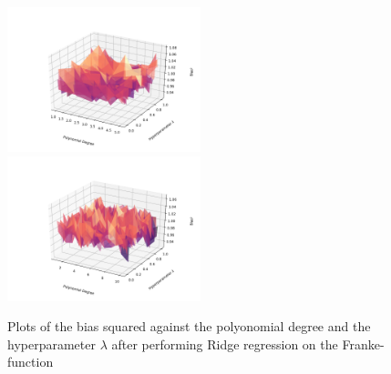 \documentclass[a4paper,10pt,english]{article}
\begin{document}
\begin{figure}[H]
	\centering 
	\includegraphics[width = 0.5\textwidth, center]{../franke_output/part_D_4.png}
	\includegraphics[width = 0.5\textwidth, center]{../franke_output/part_D_4_highdeg.png}
	\caption{
		Plots of the bias squared against the polyonomial degree and the hyperparameter $\lambda$ after performing Ridge regression on the Franke-function 
	}
	\label{part_d4}
\end{figure}




%
\end{document}
